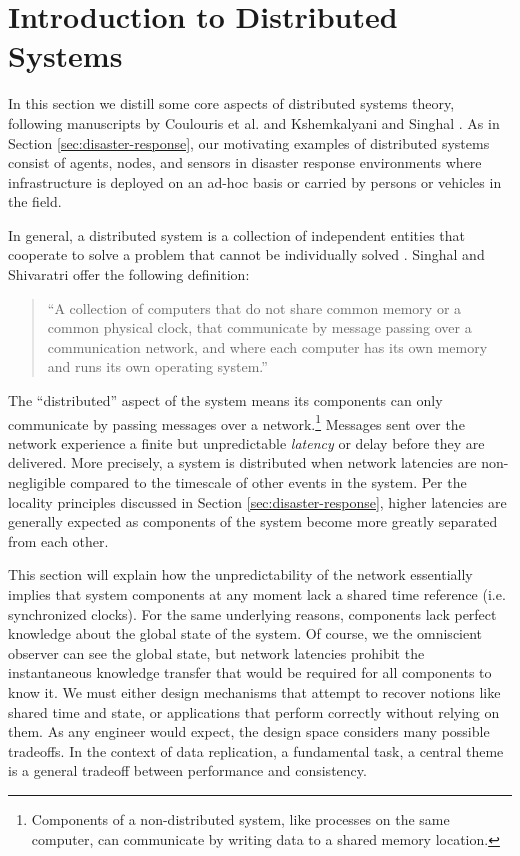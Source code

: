 \documentclass[]             %
{NASA}                       %
\theoremstyle{definition}
\begin{document}
\section{Introduction to Distributed Systems}
\label{sec:background}
In this section we distill some core aspects of distributed systems
theory, following manuscripts by Coulouris et al.
\cite{coulouris2005distributed} and Kshemkalyani and Singhal
\cite{kshemkalyani_singhal_2008}. As in Section
\ref{sec:disaster-response}, our motivating examples of distributed
systems consist of agents, nodes, and sensors in disaster response
environments where infrastructure is deployed on an ad-hoc basis or
carried by persons or vehicles in the field.

In general, a distributed system is a collection of independent
entities that cooperate to solve a problem that cannot be individually
solved \cite{kshemkalyani_singhal_2008}. Singhal and Shivaratri
\cite{10.5555/562065} offer the following definition:
\begin{quote}
  ``A collection of computers that do not share common memory or a common
  physical clock, that communicate by message passing over a communication
  network, and where each computer has its own memory and runs its own
  operating system.''
\end{quote}

The ``distributed'' aspect of the system means its components can only
communicate by passing messages over a network.\footnote{Components of
  a non-distributed system, like processes on the same computer, can
  communicate by writing data to a shared memory location.} Messages
sent over the network experience a finite but unpredictable
\emph{latency} or delay before they are delivered. More precisely, a
system is distributed when network latencies are non-negligible
compared to the timescale of other events in the system. Per the
locality principles discussed in Section \ref{sec:disaster-response},
higher latencies are generally expected as components of the system
become more greatly separated from each other.

This section will explain how the unpredictability of the network
essentially implies that system components at any moment lack a shared
time reference (i.e. synchronized clocks). For the same underlying
reasons, components lack perfect knowledge about the global state of
the system. Of course, we the omniscient observer can see the global
state, but network latencies prohibit the instantaneous knowledge
transfer that would be required for all components to know it. We must
either design mechanisms that attempt to recover notions like shared
time and state, or applications that perform correctly without relying
on them. As any engineer would expect, the design space considers many
possible tradeoffs. In the context of data replication, a fundamental
task, a central theme is a general tradeoff between performance and
consistency.
\end{document}
